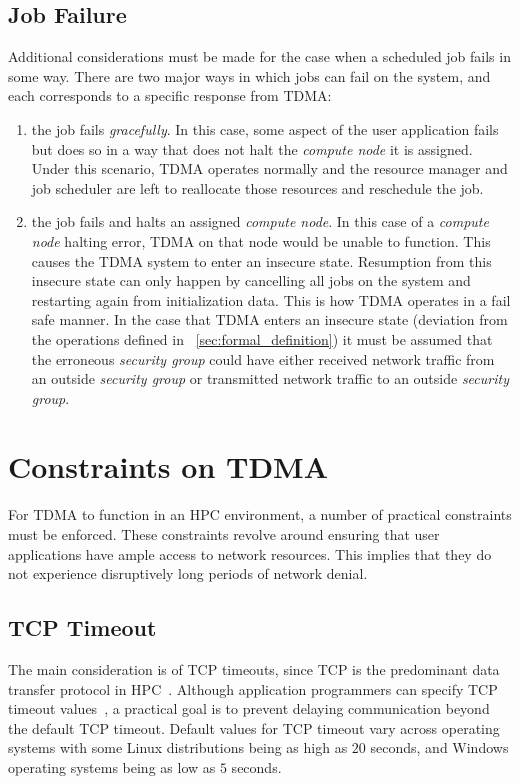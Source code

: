\documentclass[oneside,12pt]{memoir}
\begin{document}
\subsection{Job Failure}
Additional considerations must be made for the case when a scheduled job fails in some way. There are two major ways in which jobs can fail on the system, and each corresponds to a specific response from TDMA:
\begin{enumerate}
\item the job fails \textit{gracefully}. In this case, some aspect of the user application fails but does so in a way that does not halt the \textit{compute node} it is assigned. Under this scenario, TDMA operates normally and the resource manager and job scheduler are left to reallocate those resources and reschedule the job. 
\item the job fails and halts an assigned \textit{compute node}. In this case of a \textit{compute node} halting error, TDMA on that node would be unable to function. This causes the TDMA system to enter an insecure state. Resumption from this insecure state can only happen by cancelling all jobs on the system and restarting again from initialization data. This is how TDMA operates in a fail safe manner. In the case that TDMA enters an insecure state (deviation from the operations defined in ~\ref{sec:formal_definition}) it must be assumed that the erroneous \textit{security group} could have either received network traffic from an outside \textit{security group} or transmitted network traffic to an outside \textit{security group}.
\end{enumerate}

\section{Constraints on TDMA}
\label{sec:constraints}
For TDMA to function in an HPC environment, a number of practical constraints must be enforced. These constraints revolve around ensuring that user applications have ample access to network resources. This implies that they do not experience disruptively long periods of network denial. 
\subsection{TCP Timeout}
The main consideration is of TCP timeouts, since TCP is the predominant data transfer protocol in HPC~\cite{allcock2002data}. Although application programmers can specify TCP timeout values~\cite{eggert2009tcp}, a practical goal is to prevent delaying communication beyond the default TCP timeout. Default values for TCP timeout vary across operating systems with some Linux distributions being as high as $20$ seconds, and Windows operating systems being as low as $5$ seconds.
\end{document}
